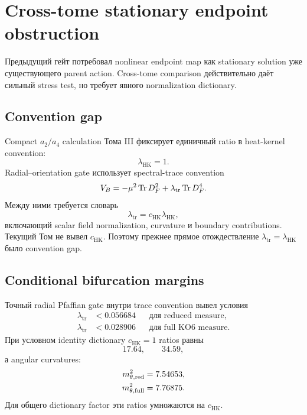 \chapter{Cross-tome stationary endpoint obstruction}

Предыдущий гейт потребовал nonlinear endpoint map как stationary solution
уже существующего parent action. Cross-tome comparison действительно даёт
сильный stress test, но требует явного normalization dictionary.

\section{Convention gap}

Compact $a_2/a_4$ calculation Тома III фиксирует единичный ratio в
heat-kernel convention:
\begin{equation}
 \lambda_{\mathrm{HK}}=1.
\end{equation}
Radial--orientation gate использует spectral-trace convention
\begin{equation}
 V_B=-\mu^2\operatorname{Tr} D_F^2+\lambda_{\mathrm{tr}}\operatorname{Tr} D_F^4.
\end{equation}
Между ними требуется словарь
\begin{equation}
 \lambda_{\mathrm{tr}}
 =c_{\mathrm{HK}}\lambda_{\mathrm{HK}},
\end{equation}
включающий scalar field normalization, curvature и boundary contributions.
Текущий Том не вывел $c_{\mathrm{HK}}$. Поэтому прежнее прямое отождествление
$\lambda_{\mathrm{tr}}=\lambda_{\mathrm{HK}}$ было convention gap.

\section{Conditional bifurcation margins}

Точный radial Pfaffian gate внутри trace convention вывел условия
\begin{align}
 \lambda_{\mathrm{tr}}&<0.056684
 &&\text{для reduced measure},\\
 \lambda_{\mathrm{tr}}&<0.028906
 &&\text{для full KO6 measure}.
\end{align}
При условном identity dictionary $c_{\mathrm{HK}}=1$ ratios равны
\begin{equation}
 17.64,\qquad 34.59,
\end{equation}
а angular curvatures:
\begin{align}
 m_{\theta,\rm red}^2&=7.54653,\\
 m_{\theta,\rm full}^2&=7.76875.
\end{align}
Для общего dictionary factor эти ratios умножаются на $c_{\mathrm{HK}}$.

